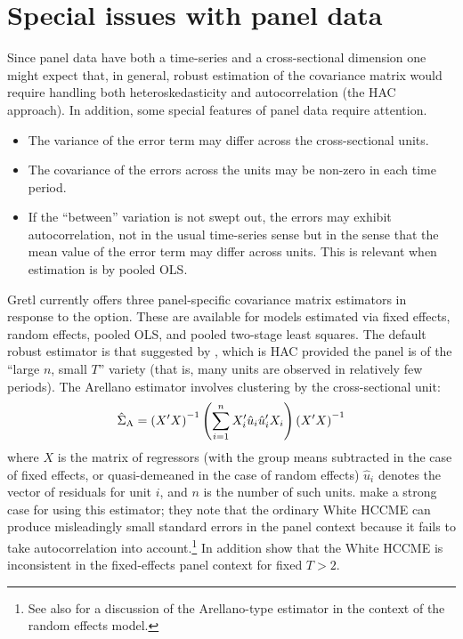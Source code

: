 \section{Special issues with panel data}
\label{sec:vcv-panel}

Since panel data have both a time-series and a cross-sectional
dimension one might expect that, in general, robust estimation of the
covariance matrix would require handling both heteroskedasticity and
autocorrelation (the HAC approach).  In addition, some special features of
panel data require attention.
\begin{itemize}
\item The variance of the error term may differ across the
  cross-sectional units.
\item The covariance of the errors across the units may be non-zero in
  each time period.
\item If the ``between'' variation is not swept out, the errors may
  exhibit autocorrelation, not in the usual time-series sense but in
  the sense that the mean value of the error term may differ across
  units.  This is relevant when estimation is by pooled OLS.
\end{itemize}

Gretl currently offers three panel-specific covariance matrix
estimators in response to the  option. These are
available for models estimated via fixed effects, random effects,
pooled OLS, and pooled two-stage least squares.  The default robust
estimator is that suggested by \cite{arellano03}, which is HAC
provided the panel is of the ``large $n$, small $T$'' variety (that
is, many units are observed in relatively few periods).  The Arellano
estimator involves clustering by the cross-sectional unit:
\[
\hat{\Sigma}_{\rm A} = 
\left(X^{\prime}X\right)^{-1}
\left( \sum_{i=1}^n X_i^{\prime} \hat{u}_i 
    \hat{u}_i^{\prime} X_i \right)
\left(X^{\prime}X\right)^{-1}
\]
where $X$ is the matrix of regressors (with the group means subtracted
in the case of fixed effects, or quasi-demeaned in the case of random
effects) $\hat{u}_i$ denotes the vector of residuals for unit $i$, and
$n$ is the number of such units.  \cite{cameron-trivedi05} make a
strong case for using this estimator; they note that the ordinary
White HCCME can produce misleadingly small standard errors in the
panel context because it fails to take autocorrelation into
account.\footnote{See also \cite{cameron-miller15} for a discussion of
  the Arellano-type estimator in the context of the random effects
  model.}  In addition \cite{stock-watson08} show that the White HCCME
is inconsistent in the fixed-effects panel context for fixed $T > 2$.

